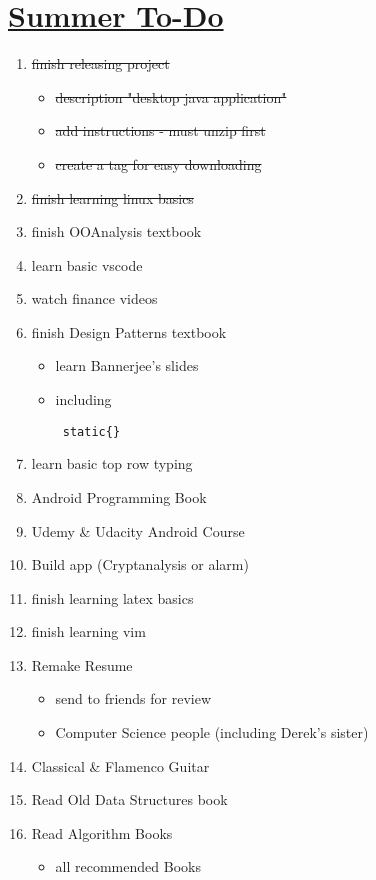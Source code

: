 \documentclass[10pt]{article}
\begin{document}
\section*{\underline{Summer To-Do}}

\begin{enumerate}
    \item \sout{finish releasing project}
    \begin{itemize}
	    \item \sout{description "desktop java application"}
	    \item \sout{add instructions - must unzip first}
        \item \sout{create a tag for easy downloading}
    \end{itemize}
    \item \sout{finish learning linux basics}
    \item finish OOAnalysis textbook
    \item learn basic vscode
    \item watch finance videos
    \item finish Design Patterns textbook
    \begin{itemize}
            \item learn Bannerjee's slides
            \item including \begin{verbatim} static{} \end{verbatim}
    \end{itemize}
    \item learn basic top row typing
    \item Android Programming Book
    \item Udemy \& Udacity Android Course
    \item Build app (Cryptanalysis or alarm)
    \item finish learning latex basics
    \item finish learning vim
    \item Remake Resume
    \begin{itemize}
        \item send to friends for review
        \item Computer Science people (including Derek's sister)
    \end{itemize}
    \item Classical \& Flamenco Guitar
    \item Read Old Data Structures book
    \item Read Algorithm Books
    \begin{itemize}
        \item all recommended Books
    \end{itemize}

\end{enumerate}
\end{document}
